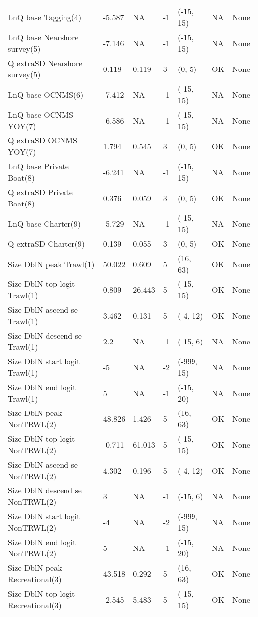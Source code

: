 \documentclass[11pt,
  english,
  letterpaper,
]{article}
\begin{document}
\begin{landscape}
\begin{longtable}[t]{>{\raggedright\arraybackslash}p{7.5cm}lllll>{\raggedright\arraybackslash}p{3.5cm}}
LnQ base Tagging(4) & -5.587 & NA & -1 & (-15, 15) & NA & None\\
LnQ base Nearshore survey(5) & -7.146 & NA & -1 & (-15, 15) & NA & None\\
Q extraSD Nearshore survey(5) & 0.118 & 0.119 & 3 & (0, 5) & OK & None\\
LnQ base OCNMS(6) & -7.412 & NA & -1 & (-15, 15) & NA & None\\
LnQ base OCNMS YOY(7) & -6.586 & NA & -1 & (-15, 15) & NA & None\\
Q extraSD OCNMS YOY(7) & 1.794 & 0.545 & 3 & (0, 5) & OK & None\\
LnQ base Private Boat(8) & -6.241 & NA & -1 & (-15, 15) & NA & None\\
Q extraSD Private Boat(8) & 0.376 & 0.059 & 3 & (0, 5) & OK & None\\
LnQ base Charter(9) & -5.729 & NA & -1 & (-15, 15) & NA & None\\
Q extraSD Charter(9) & 0.139 & 0.055 & 3 & (0, 5) & OK & None\\
Size DblN peak Trawl(1) & 50.022 & 0.609 & 5 & (16, 63) & OK & None\\
Size DblN top logit Trawl(1) & 0.809 & 26.443 & 5 & (-15, 15) & OK & None\\
Size DblN ascend se Trawl(1) & 3.462 & 0.131 & 5 & (-4, 12) & OK & None\\
Size DblN descend se Trawl(1) & 2.2 & NA & -1 & (-15, 6) & NA & None\\
Size DblN start logit Trawl(1) & -5 & NA & -2 & (-999, 15) & NA & None\\
Size DblN end logit Trawl(1) & 5 & NA & -1 & (-15, 20) & NA & None\\
Size DblN peak NonTRWL(2) & 48.826 & 1.426 & 5 & (16, 63) & OK & None\\
Size DblN top logit NonTRWL(2) & -0.711 & 61.013 & 5 & (-15, 15) & OK & None\\
Size DblN ascend se NonTRWL(2) & 4.302 & 0.196 & 5 & (-4, 12) & OK & None\\
Size DblN descend se NonTRWL(2) & 3 & NA & -1 & (-15, 6) & NA & None\\
Size DblN start logit NonTRWL(2) & -4 & NA & -2 & (-999, 15) & NA & None\\
Size DblN end logit NonTRWL(2) & 5 & NA & -1 & (-15, 20) & NA & None\\
Size DblN peak Recreational(3) & 43.518 & 0.292 & 5 & (16, 63) & OK & None\\
Size DblN top logit Recreational(3) & -2.545 & 5.483 & 5 & (-15, 15) & OK & None\\

\end{longtable}
\end{landscape}
\end{document}
